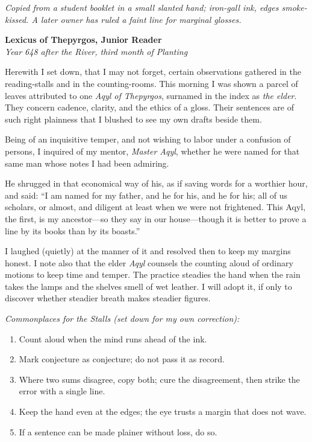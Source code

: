 \documentclass[11pt]{article}
\begin{document}
\noindent\textit{Copied from a student booklet in a small slanted hand; iron-gall ink, edges smoke-kissed. A later owner has ruled a faint line for marginal glosses.}

\medskip
\noindent\textbf{Lexicus of Thepyrgos, Junior Reader}\\
\textit{Year 648 after the River, third month of Planting}

Herewith I set down, that I may not forget, certain observations gathered in the reading-stalls and in the counting-rooms. This morning I was shown a parcel of leaves attributed to one \textit{Aqyl of Thepyrgos}, surnamed in the index as \textit{the elder}. They concern cadence, clarity, and the ethics of a gloss. Their sentences are of such right plainness that I blushed to see my own drafts beside them.

Being of an inquisitive temper, and not wishing to labor under a confusion of persons, I inquired of my mentor, \textit{Master Aqyl}, whether he were named for that same man whose notes I had been admiring.

He shrugged in that economical way of his, as if saving words for a worthier hour, and said: ``I am named for my father, and he for his, and he for his; all of us scholars, or almost, and diligent at least when we were not frightened. This Aqyl, the first, is my ancestor---so they say in our house---though it is better to prove a line by its books than by its boasts.''

I laughed (quietly) at the manner of it and resolved then to keep my margins honest. I note also that the elder \textit{Aqyl} counsels the counting aloud of ordinary motions to keep time and temper. The practice steadies the hand when the rain takes the lamps and the shelves smell of wet leather. I will adopt it, if only to discover whether steadier breath makes steadier figures.

\medskip
\noindent\textit{Commonplaces for the Stalls (set down for my own correction):}
\begin{enumerate}\setlength\itemsep{0.25em}
  \item Count aloud when the mind runs ahead of the ink.
  \item Mark conjecture as conjecture; do not pass it as record.
  \item Where two sums disagree, copy both; cure the disagreement, then strike the error with a single line.
  \item Keep the hand even at the edges; the eye trusts a margin that does not wave.
  \item If a sentence can be made plainer without loss, do so.
\end{enumerate}
\end{document}
